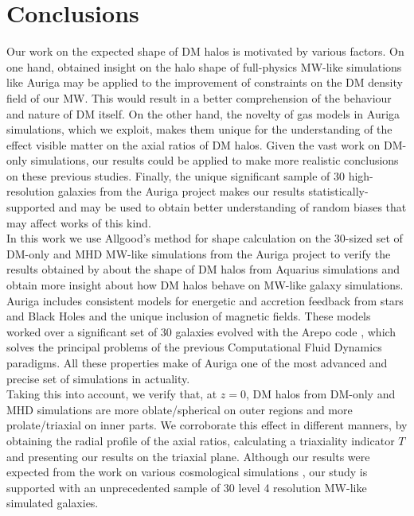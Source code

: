 \chapter{Conclusions}

Our work on the expected shape of DM halos is motivated by various factors. On one hand, obtained insight on the halo shape of full-physics MW-like simulations like Auriga \cite{auriga} may be applied to the improvement of constraints on the DM density field of our MW. This would result in a better comprehension of the behaviour and nature of DM itself. On the other hand, the novelty of gas models in Auriga simulations, which we exploit, makes them unique for the understanding of the effect visible matter on the axial ratios of DM halos. Given the vast work on DM-only simulations, our results could be applied to make more realistic conclusions on these previous studies. Finally, the unique significant sample of 30 high-resolution galaxies from the Auriga project makes our results statistically-supported and may be used to obtain better understanding of random biases that may affect works of this kind.\\  


In this work we use Allgood's method for shape calculation \cite{Allgood_et_al._2006} on the 30-sized set of DM-only and MHD MW-like simulations from the Auriga \cite{auriga} project to verify the results obtained by \cite[Vera-Ciro et al. 2011]{Vera-Ciro_et_al._2011} about the shape of DM halos from Aquarius simulations and obtain more insight about how DM halos behave on MW-like galaxy simulations. Auriga includes consistent models for energetic and accretion feedback from stars and Black Holes and the unique inclusion of magnetic fields. These models worked over a significant set of 30 galaxies evolved with the Arepo code \cite{arepo}, which solves the principal problems of the previous Computational Fluid Dynamics paradigms. All these properties make of Auriga one of the most advanced and precise set of simulations in actuality.\\ 


Taking this into account, we verify that, at $z=0$, DM halos from DM-only and MHD simulations are more oblate/spherical on outer regions and more prolate/triaxial on inner parts. We corroborate this effect in different manners, by obtaining the radial profile of the axial ratios, calculating a triaxiality indicator $T$ and presenting our results on the triaxial plane. Although our results were expected from the work on various cosmological simulations \cite{Frenk_et_al._1988,Dubinski_and_Carlberg_1991,Warren_et_al._1992,Cole_and_Lacey_1996,Hayashi_et_al._2007,Bett_et_al._2007,Vera-Ciro_et_al._2011}, our study is supported with an unprecedented sample of 30 level 4 resolution MW-like simulated galaxies.\\

